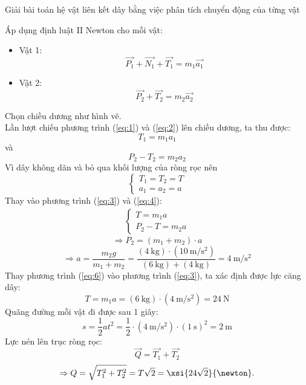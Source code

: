 \begin{dang}{Giải bài toán hệ vật liên kết dây bằng việc phân tích chuyển động của từng vật}
{\begin{enumerate}[label=\alph*)]
\begin{center}
	\end{center}
Áp dụng định luật II Newton cho mỗi vật:
\begin{itemize}
	\item Vật 1:
	\begin{equation}
		\label{eq:1}
		\overrightarrow{P_1}+\overrightarrow{N_1}+\overrightarrow{T_1}=m_1\overrightarrow{a_1}
	\end{equation}
	\item Vật 2:
	\begin{equation}
		\label{eq:2}
		\overrightarrow{P_2}+\overrightarrow{T_2}=m_2\overrightarrow{a_2}
	\end{equation}
\end{itemize}
Chọn chiều dương như hình vẽ.\\
Lần lượt chiếu phương trình (\ref{eq:1}) và (\ref{eq:2}) lên chiều dương, ta thu được:
\begin{equation}
	\label{eq:3}
	T_1=m_1a_1
\end{equation}
và
\begin{equation}
	\label{eq:4}
	P_2-T_2=m_2a_2
\end{equation}
Vì dây không dãn và bỏ qua khối lượng của ròng rọc nên
$$\begin{cases}
	T_1=T_2=T\\
	a_1=a_2=a
\end{cases}$$
Thay vào phương trình (\ref{eq:3}) và (\ref{eq:4}):
\begin{align}
	\label{eq:5}
	\begin{cases}
		T=m_1a\\
		P_2-T=m_2a
	\end{cases}
\end{align}
$$\Rightarrow P_2=\left(m_1+m_2\right)\cdot a$$
\begin{equation}
	\label{eq:6}
	\Rightarrow a=\dfrac{m_2g}{m_1+m_2}=\dfrac{\left(\SI{4}{\kilogram}\right)\cdot\left(\SI{10}{\meter/\second^2}\right)}{\left(\SI{6}{\kilogram}\right)+\left(\SI{4}{\kilogram}\right)}=\SI{4}{\meter/\second^2}
\end{equation}
Thay phương trình (\ref{eq:6}) vào phương trình (\ref{eq:3}), ta xác định được lực căng dây:
$$T=m_1a=\left(\SI{6}{\kilogram}\right)\cdot\left(\SI{4}{\meter/\second^2}\right)=\SI{24}{\newton}$$
Quãng đường mỗi vật đi được sau 1 giây:
$$s=\dfrac{1}{2}at^2=\dfrac{1}{2}\cdot\left(\SI{4}{\meter/\second^2}\right)\cdot\left(\SI{1}{\second}\right)^2=\SI{2}{\meter}$$
Lực nén lên trục ròng rọc:
$$\overrightarrow{Q}=\overrightarrow{T_1}+\overrightarrow{T_2}$$
$$\Rightarrow Q=\sqrt{T^2_1+T^2_2}=T\sqrt{2}=\xsi{24\sqrt{2}}{\newton}.$$

\end{enumerate}}
\end{dang}
